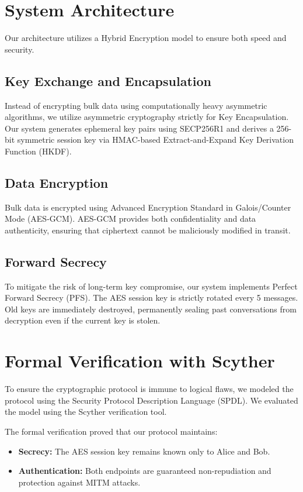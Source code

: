 \documentclass[conference]{IEEEtran}
\begin{document}
\section{System Architecture}
Our architecture utilizes a Hybrid Encryption model to ensure both speed and security.

\subsection{Key Exchange and Encapsulation}
Instead of encrypting bulk data using computationally heavy asymmetric algorithms, we utilize asymmetric cryptography strictly for Key Encapsulation. Our system generates ephemeral key pairs using SECP256R1 and derives a 256-bit symmetric session key via HMAC-based Extract-and-Expand Key Derivation Function (HKDF).

\subsection{Data Encryption}
Bulk data is encrypted using Advanced Encryption Standard in Galois/Counter Mode (AES-GCM). AES-GCM provides both confidentiality and data authenticity, ensuring that ciphertext cannot be maliciously modified in transit.

\subsection{Forward Secrecy}
To mitigate the risk of long-term key compromise, our system implements Perfect Forward Secrecy (PFS). The AES session key is strictly rotated every 5 messages. Old keys are immediately destroyed, permanently sealing past conversations from decryption even if the current key is stolen.

\section{Formal Verification with Scyther}
To ensure the cryptographic protocol is immune to logical flaws, we modeled the protocol using the Security Protocol Description Language (SPDL). We evaluated the model using the Scyther verification tool.

The formal verification proved that our protocol maintains:
\begin{itemize}
    \item \textbf{Secrecy:} The AES session key remains known only to Alice and Bob.
    \item \textbf{Authentication:} Both endpoints are guaranteed non-repudiation and protection against MITM attacks.
\end{itemize}
\end{document}
